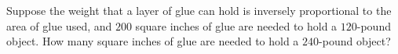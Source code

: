 Suppose the weight that a layer of glue can hold is inversely proportional to the area of glue used, and $200$ square inches of glue are needed to hold a $120$-pound object. How many square inches of glue are needed to hold a $240$-pound object?
